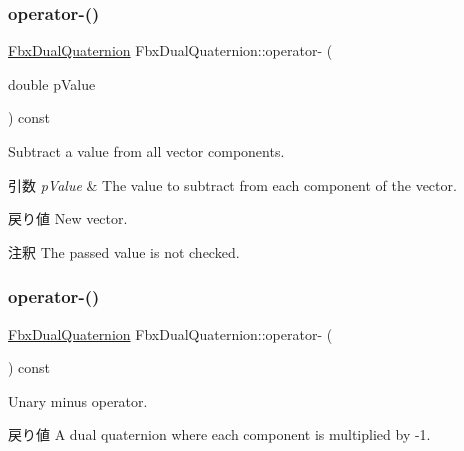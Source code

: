 \subsubsection{\texorpdfstring{operator-\/()}{operator-()}\hspace{0.1cm}{\footnotesize\ttfamily [1/3]}}
{\footnotesize\ttfamily \hyperlink{class_fbx_dual_quaternion}{Fbx\+Dual\+Quaternion} Fbx\+Dual\+Quaternion\+::operator-\/ (\begin{DoxyParamCaption}\item[{double}]{p\+Value }\end{DoxyParamCaption}) const}

Subtract a value from all vector components. 
\begin{DoxyParams}{引数}
{\em p\+Value} & The value to subtract from each component of the vector. \\
\hline
\end{DoxyParams}
\begin{DoxyReturn}{戻り値}
New vector. 
\end{DoxyReturn}
\begin{DoxyRemark}{注釈}
The passed value is not checked. 
\end{DoxyRemark}
\mbox{\label{class_fbx_dual_quaternion_a167b1147fed330bb9b2083f3252f30f6}} 
\subsubsection{\texorpdfstring{operator-\/()}{operator-()}\hspace{0.1cm}{\footnotesize\ttfamily [2/3]}}
{\footnotesize\ttfamily \hyperlink{class_fbx_dual_quaternion}{Fbx\+Dual\+Quaternion} Fbx\+Dual\+Quaternion\+::operator-\/ (\begin{DoxyParamCaption}{ }\end{DoxyParamCaption}) const}

Unary minus operator. \begin{DoxyReturn}{戻り値}
A dual quaternion where each component is multiplied by -\/1. 
\end{DoxyReturn}
\mbox{\label{class_fbx_dual_quaternion_a7ae142f9a03771efc12fbdb7a192e7cb}} 
